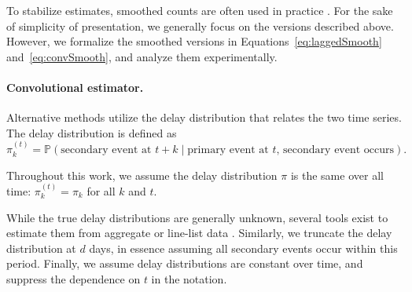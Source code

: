 \documentclass{article}
\newcommand{\given}{\; \vert \;}
\newcommand{\djmcomment}[1]{{\color{teal}[DJM: #1]}}
\newcommand{\jmgcomment}[1]{{\color{cyan}[JMG: #1]}}
\begin{document}
To stabilize estimates, smoothed counts are often used in practice \citep{germany,timevar_ifr,LIU2023100350}. For the sake of simplicity of presentation, we generally focus on the versions described above. However, we formalize the smoothed versions in Equations~\eqref{eq:laggedSmooth} and~\eqref{eq:convSmooth}, and analyze them experimentally.

\paragraph{Convolutional estimator.} Alternative methods utilize the delay distribution that relates
the two time series. The delay distribution is defined as 
\begin{equation*}
    \pi_k^{(t)} = \mathbb{P}(\text{secondary event at $t+k$}\given\text{primary event at $t$, secondary event occurs}).
\end{equation*}

\noindent Throughout this work, we assume the delay distribution $\pi$ is the same over all time: $\pi_k^{(t)} =
\pi_k$ for all $k$ and $t$.

While the true delay distributions are generally unknown, several
tools exist to estimate them 
from aggregate or line-list data \citep{delay_distrs}. 
Similarly,
we truncate the delay distribution at $d$ days, in essence assuming all
secondary events occur within this period. Finally, we assume delay
distributions are constant over time, and suppress the dependence on $t$ in the notation.
\end{document}
